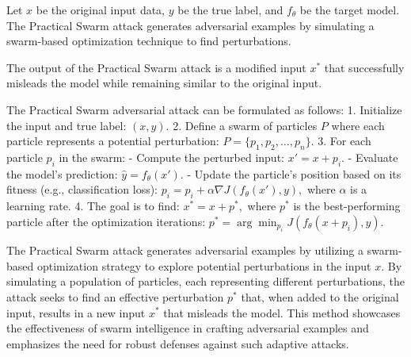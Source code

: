 Let \( x \) be the original input data, \( y \) be the true label, and \( f_{\theta} \) be the target model. The Practical Swarm attack generates adversarial examples by simulating a swarm-based optimization technique to find perturbations.

The output of the Practical Swarm attack is a modified input \( x^* \) that successfully misleads the model while remaining similar to the original input.

The Practical Swarm adversarial attack can be formulated as follows:
1. Initialize the input and true label:
   $
   (x, y).
   $
2. Define a swarm of particles \( P \) where each particle represents a potential perturbation:
   $
   P = \{p_1, p_2, \ldots, p_n\}.
   $
3. For each particle \( p_i \) in the swarm:
   - Compute the perturbed input:
   $
   x' = x + p_i.
   $
   - Evaluate the model's prediction:
   $
   \hat{y} = f_{\theta}(x').
   $
   - Update the particle's position based on its fitness (e.g., classification loss):
   $
   p_i = p_i + \alpha \nabla J(f_{\theta}(x'), y),
   $
   where \( \alpha \) is a learning rate.
4. The goal is to find:
   $
   x^* = x + p^*,
   $
   where \( p^* \) is the best-performing particle after the optimization iterations:
   $
   p^* = \arg\min_{p_i} J(f_{\theta}(x + p_i), y).
   $

The Practical Swarm attack generates adversarial examples by utilizing a swarm-based optimization strategy to explore potential perturbations in the input \( x \). By simulating a population of particles, each representing different perturbations, the attack seeks to find an effective perturbation \( p^* \) that, when added to the original input, results in a new input \( x^* \) that misleads the model. This method showcases the effectiveness of swarm intelligence in crafting adversarial examples and emphasizes the need for robust defenses against such adaptive attacks.

